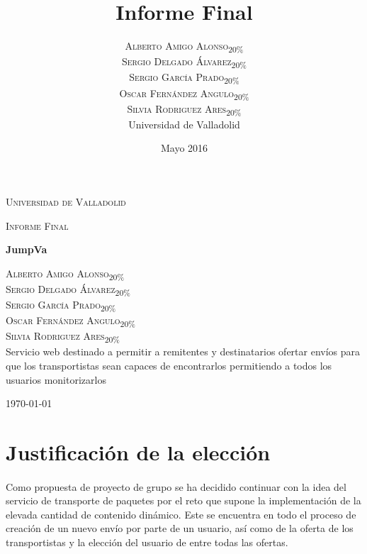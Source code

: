\documentclass[10pt, a4paper,spanish]{article}
\title{\vspace{-15mm}\fontsize{24pt}{10pt}\selectfont\textbf{Informe Final}} %
\author{
\large
\textsc{Alberto Amigo Alonso\textsubscript{20\%}}\\[2mm] %
\textsc{Sergio Delgado Álvarez\textsubscript{20\%}}\\[2mm] %
\textsc{Sergio García Prado\textsubscript{20\%}}\\[2mm] %
\textsc{Oscar Fernández Angulo\textsubscript{20\%}}\\[2mm] %
\textsc{Silvia Rodriguez Ares\textsubscript{20\%}}\\[2mm] %
\normalsize Universidad de Valladolid \\ %
\vspace{-5mm}
}
\date{Mayo 2016}
\begin{document}
	\begin{titlepage}
	\centering
		{\scshape\LARGE Universidad de Valladolid \par}
		\vspace{1cm}
		{\scshape\Large Informe Final\par}
		\vspace{1.5cm}
		{\huge\bfseries JumpVa\par}
		\vspace{2cm}
		{\large
		\textsc{Alberto Amigo Alonso\textsubscript{20\%}}\\[2mm] %
		\textsc{Sergio Delgado Álvarez\textsubscript{20\%}}\\[2mm] %
		\textsc{Sergio García Prado\textsubscript{20\%}}\\[2mm] %
		\textsc{Oscar Fernández Angulo\textsubscript{20\%}}\\[2mm] %
		\textsc{Silvia Rodriguez Ares\textsubscript{20\%}}\\[2mm] %
		\vspace{-5mm}
		}
		\vfill
		Servicio web destinado a permitir a remitentes y destinatarios ofertar envíos para que los transportistas sean capaces de encontrarlos permitiendo a todos los usuarios monitorizarlos

		\vfill

		{\large \today\par}
	\end{titlepage}

	\thispagestyle{fancy} %


	\tableofcontents
	\newpage


	\section{Justificación de la elección}

		\paragraph{}
		Como propuesta de proyecto de grupo se ha decidido continuar con la idea del servicio de transporte de paquetes por el reto que supone la implementación de la elevada cantidad de contenido dinámico. Este se encuentra en todo el proceso de creación de un nuevo envío por parte de un usuario, así como de la oferta de los transportistas y la elección del usuario de entre todas las ofertas.
\end{document}
